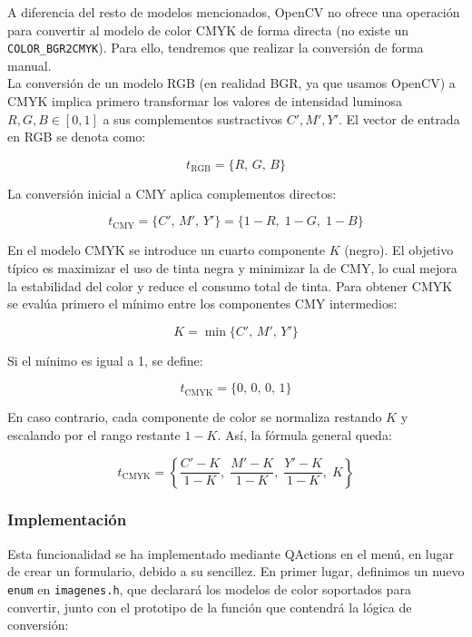 \documentclass[11pt]{article}
\begin{document}
          A diferencia del resto de modelos mencionados, OpenCV no ofrece una operación
          para convertir al modelo de color CMYK de forma directa (no existe un
          \texttt{COLOR\_BGR2CMYK}). Para ello, tendremos que realizar la conversión de
          forma manual. \\

          La conversión de un modelo RGB (en realidad BGR, ya que usamos OpenCV) a CMYK
          implica primero transformar los valores de intensidad luminosa \(R, G, B \in
          [0,1]\) a sus complementos sustractivos \(C', M', Y'\). El vector de entrada en
          RGB se denota como: \cite{eswiki:164414514}

          \[ t_{\text{RGB}} = \{R,\, G,\, B\} \]

          \noindent
          La conversión inicial a CMY aplica complementos directos:

          \[ t_{\text{CMY}} = \{C',\, M',\, Y'\} = \{1 - R,\; 1 - G,\; 1 - B\} \]

          En el modelo CMYK se introduce un cuarto componente \(K\) (negro). El objetivo
          típico es maximizar el uso de tinta negra y minimizar la de CMY, lo cual mejora
          la estabilidad del color y reduce el consumo total de tinta. Para obtener CMYK
          se evalúa primero el mínimo entre los componentes CMY intermedios:

          \[ K = \min\{C',\, M',\, Y'\} \]

          \noindent
          Si el mínimo es igual a 1, se define:

          \[ t_{\text{CMYK}} = \{0,\, 0,\, 0,\, 1\} \]

          En caso contrario, cada componente de color se normaliza restando \(K\) y
          escalando por el rango restante \(1-K\). Así, la fórmula general queda:

          \[
              t_{\text{CMYK}} =
              \left\{
              \frac{C' - K}{1 - K},\;
              \frac{M' - K}{1 - K},\;
              \frac{Y' - K}{1 - K},\;
              K
              \right\}
          \]

      \subsubsection{Implementación}

          Esta funcionalidad se ha implementado mediante QActions en el menú, en lugar de
          crear un formulario, debido a su sencillez. En primer lugar, definimos un nuevo
          \texttt{enum} en \texttt{imagenes.h}, que declarará los modelos de color
          soportados para convertir, junto con el prototipo de la función que contendrá
          la lógica de conversión:
\end{document}
